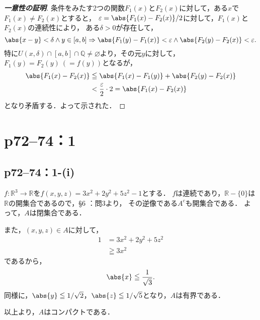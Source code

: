 \documentclass[a4paper,10pt,fleqn]{ltjsarticle}
\begin{document}
\begin{leftbar}
    \begin{proof}[\textup{\textbf{一意性の証明}}]
        条件をみたす2つの関数$F_1 (x)$と$F_2(x)$に対して，ある$x$で$F_1(x) \ne F_2(x)$とすると，
        $\varepsilon = \abs{F_1(x) - F_2(x)}/2$に対して，$F_1(x)$と$F_2(x)$の連続性により，
        ある$\delta >0$が存在して，
        \[
            \abs{x-y}<\delta \land y \in [a,b] \Rightarrow \abs{F_1(y)-F_1(x)}<\varepsilon \land  \abs{F_2(y)-F_2(x)}<\varepsilon.
        \]
        特に$ U (x,\delta) \cap [a,b] \cap \mathbb{Q} \ne \varnothing$より，その元$y$に対して，
        $F_1 (y)=F_2(y)~(=f(y))$となるが，
        \begin{align*}
            \abs{F_1(x)-F_2(x)} & \leqq \abs{F_1(x)-F_1(y)} + \abs{F_2(y)-F_2(x)}          \\
                                & < \frac{\varepsilon}{2} \cdot 2  = \abs{F_1(x) - F_2(x)}
        \end{align*}
        となり矛盾する．よって示された．
    \end{proof}
\end{leftbar}

\newpage

\section*{p72--74：1}


\subsection*{p72--74：1-(i)}

\begin{tleftbar}
    $ f\colon \mathbb{R}^3 \to \mathbb{R}$を$f(x,y,z)=3x^2 + 2y^2 + 5z^2 -1$とする．
    $f$は連続であり，$\mathbb{R} -\{ 0 \}$は$\mathbb{R}$の開集合であるので，\S 6 ：問3より，
    その逆像である$A^c$も開集合である．
    よって，$A$は閉集合である．

    また，$(x,y,z) \in A$に対して，
    \begin{align*}
        1 & = 3x^2 + 2y^2 + 5z^2 \\
          & \geqq 3x^2
    \end{align*}
    であるから，
    \[
        \abs{x} \leqq \frac{1}{\sqrt{3}}.
    \]
    同様に，$ \abs{y} \leqq 1/\sqrt{2}$，$\abs{z} \leqq 1/\sqrt{5}$となり，$A$は有界である．

    以上より，$A$はコンパクトである．
\end{tleftbar}
\end{document}
